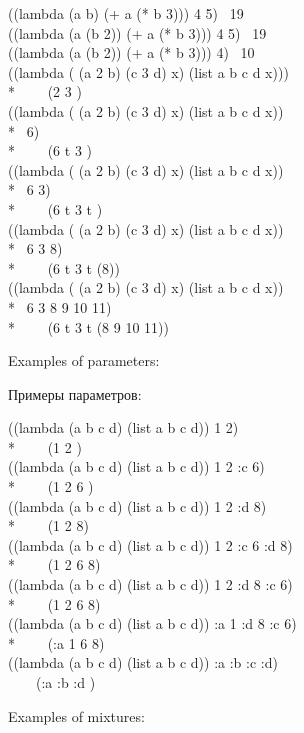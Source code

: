 \begin{lisp}
((lambda (a b) (+ a (* b 3))) 4 5) \EV\ 19 \\
((lambda (a  (b 2)) (+ a (* b 3))) 4 5) \EV\ 19 \\
((lambda (a  (b 2)) (+ a (* b 3))) 4) \EV\ 10 \\
((lambda ( (a 2 b) (c 3 d)  x) (list a b c d x))) \\*
~~~\EV\ (2 {\false} 3 {\false} {\false}) \\
((lambda ( (a 2 b) (c 3 d)  x) (list a b c d x)) \\*
~6) \\*
~~~\EV\ (6 t 3 {\false} {\false}) \\
((lambda ( (a 2 b) (c 3 d)  x) (list a b c d x)) \\*
~6 3) \\*
~~~\EV\ (6 t 3 t {\false}) \\
((lambda ( (a 2 b) (c 3 d)  x) (list a b c d x)) \\*
~6 3 8) \\*
~~~\EV\ (6 t 3 t (8)) \\
((lambda ( (a 2 b) (c 3 d)  x) (list a b c d x)) \\*
~6 3 8 9 10 11) \\*
~~~\EV\ (6 t 3 t (8 9 10 11))
\end{lisp}
Examples of  parameters:

\noindent
Примеры  параметров:
\begin{lisp}
((lambda (a b  c d) (list a b c d)) 1 2) \\*
~~~\EV\ (1 2 {\nil} {\nil}) \\
((lambda (a b  c d) (list a b c d)) 1 2 :c 6) \\*
~~~\EV\ (1 2 6 {\nil}) \\
((lambda (a b  c d) (list a b c d)) 1 2 :d 8) \\*
~~~\EV\ (1 2 {\nil} 8) \\
((lambda (a b  c d) (list a b c d)) 1 2 :c 6 :d 8) \\*
~~~\EV\ (1 2 6 8) \\
((lambda (a b  c d) (list a b c d)) 1 2 :d 8 :c 6) \\*
~~~\EV\ (1 2 6 8) \\
((lambda (a b  c d) (list a b c d)) :a 1 :d 8 :c 6) \\*
~~~\EV\ (:a 1 6 8) \\
((lambda (a b  c d) (list a b c d)) :a :b :c :d) \\
~~~\EV\ (:a :b :d {\nil})
\end{lisp}
Examples of mixtures:

